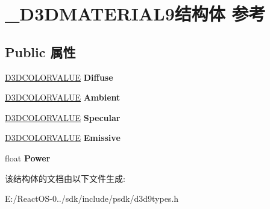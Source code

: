 \hypertarget{struct___d3_d_m_a_t_e_r_i_a_l9}{}\section{\+\_\+\+D3\+D\+M\+A\+T\+E\+R\+I\+A\+L9结构体 参考}
\label{struct___d3_d_m_a_t_e_r_i_a_l9}
\subsection*{Public 属性}
\begin{DoxyCompactItemize}
\item 
\mbox{\label{struct___d3_d_m_a_t_e_r_i_a_l9_a39764329e26c4ee8a846b6f53824520c}} 
\hyperlink{struct___d3_d_c_o_l_o_r_v_a_l_u_e}{D3\+D\+C\+O\+L\+O\+R\+V\+A\+L\+UE} {\bfseries Diffuse}
\item 
\mbox{\label{struct___d3_d_m_a_t_e_r_i_a_l9_a5a4631a522b9a1dd950db106d565e951}} 
\hyperlink{struct___d3_d_c_o_l_o_r_v_a_l_u_e}{D3\+D\+C\+O\+L\+O\+R\+V\+A\+L\+UE} {\bfseries Ambient}
\item 
\mbox{\label{struct___d3_d_m_a_t_e_r_i_a_l9_aed24651b9d32a85c3e8da906427fd662}} 
\hyperlink{struct___d3_d_c_o_l_o_r_v_a_l_u_e}{D3\+D\+C\+O\+L\+O\+R\+V\+A\+L\+UE} {\bfseries Specular}
\item 
\mbox{\label{struct___d3_d_m_a_t_e_r_i_a_l9_a172d2fae4e3e759a282afcda2398affc}} 
\hyperlink{struct___d3_d_c_o_l_o_r_v_a_l_u_e}{D3\+D\+C\+O\+L\+O\+R\+V\+A\+L\+UE} {\bfseries Emissive}
\item 
\mbox{\label{struct___d3_d_m_a_t_e_r_i_a_l9_af8483f97a3fb428b86f1bed06c86d4c0}} 
float {\bfseries Power}
\end{DoxyCompactItemize}


该结构体的文档由以下文件生成\+:\begin{DoxyCompactItemize}
\item 
E\+:/\+React\+O\+S-\/0../sdk/include/psdk/d3d9types.\+h\end{DoxyCompactItemize}
